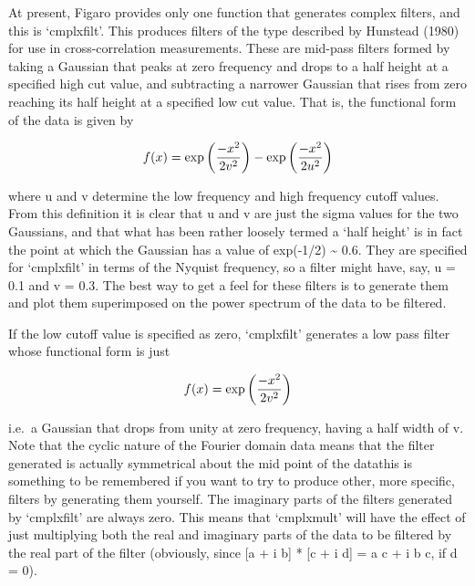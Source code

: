    At present, Figaro provides only one function that generates complex
   filters, and this is `cmplxfilt'.  This produces filters of the type
   described by Hunstead (1980) for use in cross-correlation
   measurements.  These are mid-pass filters formed by taking a Gaussian
   that peaks at zero frequency and drops to a half height at a
   specified high cut value, and subtracting a narrower Gaussian that
   rises from zero reaching its half height at a specified low cut
   value.  That is, the functional form of the data is given by

\begin{displaymath}
   f(x) = \exp{\left({{-x^2}\over{2 v^2}}\right)}
        - \exp{\left({{-x^2}\over{2 u^2}}\right)}
\end{displaymath}

   where u and v determine the low frequency and high frequency cutoff
   values. From this definition it is clear that u and v are just the
   sigma values for the two Gaussians, and that what has been rather
   loosely termed a `half height' is in fact the point at which the
   Gaussian has a value of exp(-1/2) \~{} 0.6. They are specified for
   `cmplxfilt' in terms of the Nyquist frequency, so a filter might
   have, say, u = 0.1 and v = 0.3. The best way to get a feel for these
   filters is to generate them and plot them superimposed on the power
   spectrum of the data to be filtered.

   If the low cutoff value is specified as zero, `cmplxfilt' generates
   a low pass filter whose functional form is just

\begin{displaymath}
   f(x) = \exp{\left({{-x^2}\over{2 v^2}}\right)}
\end{displaymath}

   i.e.\ a Gaussian that drops from unity at zero frequency, having a
   half width of v.  Note that the cyclic nature of the Fourier domain
   data means that the filter generated is actually symmetrical about
   the mid point of the data\latorhtm{---}{-}this is something to be
   remembered if you
   want to try to produce other, more specific, filters by generating
   them yourself. The imaginary parts of the filters generated by
   `cmplxfilt' are always zero.  This means that `cmplxmult' will have
   the effect of just multiplying both the real and imaginary parts of
   the data to be filtered by the real part of the filter (obviously,
   since [a + i b] * [c + i d] = a c + i b c, if d = 0).

